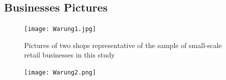 \documentclass[11.5pt]{article}
\begin{document}
\begin{appendices}
\pagebreak




\section{Businesses Pictures}\label{sec:expbusinesses}

\begin{figure}[h!]
\centering
\caption{Pictures of two shops representative of the sample of small-scale retail businesses in this study}
\label{warung1}
    \texttt{[image: Warung1.jpg]}
\end{figure}

\begin{figure}[h!]
\centering
\label{warung2}
    \texttt{[image: Warung2.png]}
\end{figure}

\end{appendices}
\end{document}
